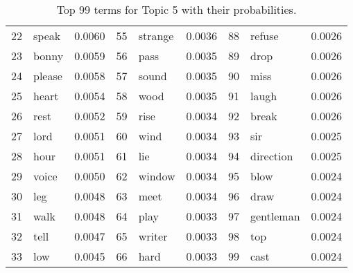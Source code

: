 \begin{table}[ht]
\begin{tabular}{rlrrlrrlr}
  22 & speak & 0.0060 & 55 & strange & 0.0036 & 88 & refuse & 0.0026 \\ 
  23 & bonny & 0.0059 & 56 & pass & 0.0035 & 89 & drop & 0.0026 \\ 
  24 & please & 0.0058 & 57 & sound & 0.0035 & 90 & miss & 0.0026 \\ 
  25 & heart & 0.0054 & 58 & wood & 0.0035 & 91 & laugh & 0.0026 \\ 
  26 & rest & 0.0052 & 59 & rise & 0.0034 & 92 & break & 0.0026 \\ 
  27 & lord & 0.0051 & 60 & wind & 0.0034 & 93 & sir & 0.0025 \\ 
  28 & hour & 0.0051 & 61 & lie & 0.0034 & 94 & direction & 0.0025 \\ 
  29 & voice & 0.0050 & 62 & window & 0.0034 & 95 & blow & 0.0024 \\ 
  30 & leg & 0.0048 & 63 & meet & 0.0034 & 96 & draw & 0.0024 \\ 
  31 & walk & 0.0048 & 64 & play & 0.0033 & 97 & gentleman & 0.0024 \\ 
  32 & tell & 0.0047 & 65 & writer & 0.0033 & 98 & top & 0.0024 \\ 
  33 & low & 0.0045 & 66 & hard & 0.0033 & 99 & cast & 0.0024 \\ 
   \hline
\end{tabular}
\caption{\small{ Top 99 terms for Topic 5 with their probabilities.}} 
\label{topic_5_terms}
\end{table}
